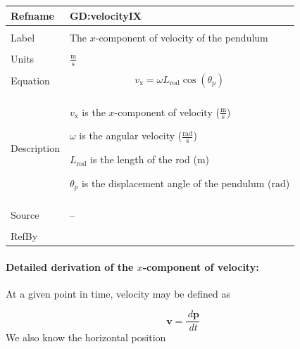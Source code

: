 \documentclass[12pt]{article}
\begin{document}
\vspace{\baselineskip}
\noindent
\begin{minipage}{\textwidth}
\begin{tabular}{>{\raggedright}p{}>{\raggedright\arraybackslash}p{}}
\toprule \textbf{Refname} & \textbf{GD:velocityIX}
\label{GD:velocityIX}
\\ \midrule \\
Label & The $x$-component of velocity of the pendulum
        
\\ \midrule \\
Units & $\frac{\text{m}}{\text{s}}$
        
\\ \midrule \\
Equation & \begin{displaymath}
           {v_{\text{x}}}=ω {L_{\text{rod}}} \cos\left({θ_{p}}\right)
           \end{displaymath}
\\ \midrule \\
Description & \begin{symbDescription}
              \item{${v_{\text{x}}}$ is the $x$-component of velocity ($\frac{\text{m}}{\text{s}}$)}
              \item{$ω$ is the angular velocity ($\frac{\text{rad}}{\text{s}}$)}
              \item{${L_{\text{rod}}}$ is the length of the rod (${\text{m}}$)}
              \item{${θ_{p}}$ is the displacement angle of the pendulum (${\text{rad}}$)}
              \end{symbDescription}
\\ \midrule \\
Source & --
         
\\ \midrule \\
RefBy & 
\\ \bottomrule
\end{tabular}
\end{minipage}
\paragraph{Detailed derivation of the $x$-component of velocity:}
\label{GD:velocityIXDeriv}
At a given point in time, velocity may be defined as

\begin{displaymath}
\symbf{v}=\frac{\,d\symbf{p}}{\,dt}
\end{displaymath}
We also know the horizontal position
\end{document}
